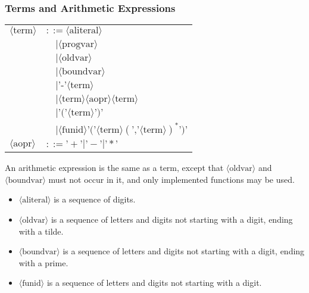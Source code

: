 \begin{multicols}{2}
\subsubsection{Terms and Arithmetic Expressions}
\begin{tabularx}{\linewidth}{Xl}
  $\langle \text{term} \rangle$ & $::= \langle \text{aliteral} \rangle$\\
   & $\quad | \langle \text{progvar} \rangle$\\
   & $\quad | \langle \text{oldvar} \rangle$\\
   & $\quad | \langle \text{boundvar} \rangle$\\
   & $\quad | \text{'-'} \langle \text{term} \rangle$\\
   & $\quad | \langle \text{term} \rangle \langle \text{aopr} \rangle \langle \text{term} \rangle$\\
   & $\quad | \text{'('} \langle \text{term} \rangle \text{')'}$\\
   & $\quad | \langle \text{funid} \rangle \text{'('} \langle \text{term} \rangle \left( \text{','} \langle \text{term} \rangle \right)^* \text{')'}$\\
  $\langle \text{aopr} \rangle$ & $::= \text{'}+\text{'} | \text{'}-\text{'} | \text{'}*\text{'}$\\
\end{tabularx}
An arithmetic expression is the same as a term, except that $\langle \text{oldvar} \rangle$ and $\langle \text{boundvar} \rangle$ must not occur in it, and only implemented functions may be used.
\begin{itemize}
  \item $\langle \text{aliteral} \rangle$ is a sequence of digits.
  \item $\langle \text{oldvar} \rangle$ is a sequence of letters and digits not starting with a digit, ending with a tilde.
  \item $\langle \text{boundvar} \rangle$ is a sequence of letters and digits not starting with a digit, ending with a prime.
  \item $\langle \text{funid} \rangle$ is a sequence of letters and digits not starting with a digit.
\end{itemize}


\end{multicols}
